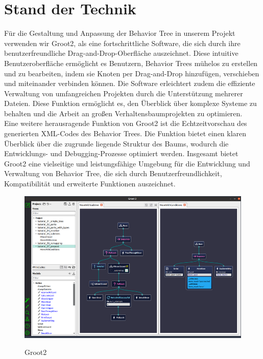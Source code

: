 \section{Stand der Technik}
Für die Gestaltung und Anpassung der Behavior Tree in unserem Projekt verwenden wir Groot2, als eine fortschrittliche Software, die sich durch ihre benutzerfreundliche Drag-and-Drop-Oberfläche auszeichnet. Diese intuitive Benutzeroberfläche ermöglicht es Benutzern, Behavior Trees mühelos zu erstellen und zu bearbeiten, indem sie Knoten per Drag-and-Drop hinzufügen, verschieben und miteinander verbinden können.
Die Software erleichtert zudem die effiziente Verwaltung von umfangreichen Projekten durch die Unterstützung mehrerer Dateien. Diese Funktion ermöglicht es, den Überblick über komplexe Systeme zu behalten und die Arbeit an großen Verhaltensbaumprojekten zu optimieren.
\cite{groot2}\\

Eine weitere herausragende Funktion von Groot2 ist die Echtzeitvorschau des generierten XML-Codes des Behavior Trees. Die Funktion bietet einen klaren Überblick über die zugrunde liegende Struktur des Baums, wodurch die Entwicklungs- und Debugging-Prozesse optimiert werden. Insgesamt bietet Groot2 eine vielseitige und leistungsfähige Umgebung für die Entwicklung und Verwaltung von Behavior Tree, die sich durch Benutzerfreundlichkeit, Kompatibilität und erweiterte Funktionen auszeichnet.\cite{groot2}

\begin{figure}[H]
    \centering
    \includegraphics[width=0.85\linewidth]{Pictures/grafik2_groot2.png}
    \caption{Groot2}
    \cite{groot2}
\end{figure}

